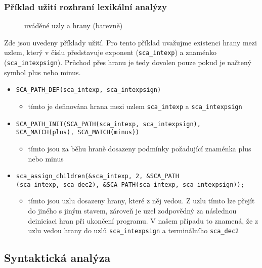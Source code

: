 \documentclass[a4paper, 11pt]{article}
\begin{document}
\subsubsection{Příklad užití rozhraní lexikální analýzy}
\begin{wrapfigure}{r}{0.3\textwidth}
\raggedright
\caption{uváděné uzly a hrany (barevně)}
\end{wrapfigure}
Zde jsou uvedeny příklady užití. Pro tento příklad uvažujme existenci hrany mezi uzlem, který v číslu představuje exponent (\verb|sca_intexp|) a znaménko (\verb|sca_intexpsign|). Průchod přes hranu je tedy dovolen pouze pokud je načtený symbol plus nebo minus.
\begin{itemize}
    \item \verb|SCA_PATH_DEF(sca_intexp, sca_intexpsign)|
    \begin{itemize}
        \item tímto je definována hrana mezi uzlem \verb|sca_intexp| a \verb|sca_intexpsign|
    \end{itemize}
    \item \verb|SCA_PATH_INIT(SCA_PATH(sca_intexp, sca_intexpsign),|\\ \verb|SCA_MATCH(plus), SCA_MATCH(minus))|
    \begin{itemize}
        \item tímto jsou za běhu hraně dosazeny podmínky požadující znaménka plus nebo minus
    \end{itemize}
    \item \verb|sca_assign_children(&sca_intexp, 2, &SCA_PATH|\\ \verb|(sca_intexp, sca_dec2), &SCA_PATH(sca_intexp, sca_intexpsign));|
    \begin{itemize}
        \item tímto jsou uzlu dosazeny hrany, které z něj vedou. Z uzlu tímto lze přejít do jiného s jiným stavem, zároveň je uzel zodpovědný za následnou deiniciaci hran při ukončení programu. V našem případu to znamená, že z uzlu vedou hrany do uzlů \verb|sca_intexpsign| a terminálního \verb|sca_dec2|
    \end{itemize}
\end{itemize}

\subsection{Syntaktická analýza}
\end{document}
